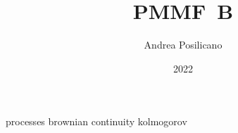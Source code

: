\usepackage	{PMMF-style/style}

\title	{PMMF~B}
\author	{Andrea Posilicano}
\date	{2022}


\maketitle
	{processes}
	{brownian}
	{continuity}
\appendix
	{kolmogorov}

